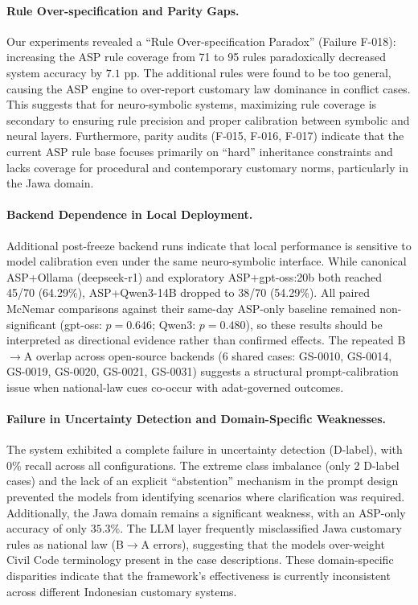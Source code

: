 \documentclass[11pt]{article}
\begin{document}
\paragraph{Rule Over-specification and Parity Gaps.}
Our experiments revealed a ``Rule Over-specification Paradox'' (Failure F-018): increasing the ASP rule coverage from 71 to 95 rules paradoxically decreased system accuracy by $7.1$ pp. The additional rules were found to be too general, causing the ASP engine to over-report customary law dominance in conflict cases. This suggests that for neuro-symbolic systems, maximizing rule coverage is secondary to ensuring rule precision and proper calibration between symbolic and neural layers. Furthermore, parity audits (F-015, F-016, F-017) indicate that the current ASP rule base focuses primarily on ``hard'' inheritance constraints and lacks coverage for procedural and contemporary customary norms, particularly in the Jawa domain.

\paragraph{Backend Dependence in Local Deployment.}
Additional post-freeze backend runs indicate that local performance is sensitive to model calibration even under the same neuro-symbolic interface. While canonical ASP+Ollama (deepseek-r1) and exploratory ASP+gpt-oss:20b both reached 45/70 (64.29\%), ASP+Qwen3-14B dropped to 38/70 (54.29\%). All paired McNemar comparisons against their same-day ASP-only baseline remained non-significant (gpt-oss: $p=0.646$; Qwen3: $p=0.480$), so these results should be interpreted as directional evidence rather than confirmed effects. The repeated B$\rightarrow$A overlap across open-source backends (6 shared cases: GS-0010, GS-0014, GS-0019, GS-0020, GS-0021, GS-0031) suggests a structural prompt-calibration issue when national-law cues co-occur with adat-governed outcomes.

\paragraph{Failure in Uncertainty Detection and Domain-Specific Weaknesses.}
The system exhibited a complete failure in uncertainty detection (D-label), with $0\%$ recall across all configurations. The extreme class imbalance (only 2 D-label cases) and the lack of an explicit ``abstention'' mechanism in the prompt design prevented the models from identifying scenarios where clarification was required. Additionally, the Jawa domain remains a significant weakness, with an ASP-only accuracy of only $35.3\%$. The LLM layer frequently misclassified Jawa customary rules as national law (B$\rightarrow$A errors), suggesting that the models over-weight Civil Code terminology present in the case descriptions. These domain-specific disparities indicate that the framework's effectiveness is currently inconsistent across different Indonesian customary systems.
\end{document}
